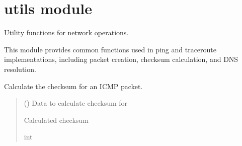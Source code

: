 \documentclass[letterpaper,10pt,english]{sphinxmanual}
\begin{document}
\sphinxstepscope


\chapter{utils module}
\label{\detokenize{utils:module-utils}}\label{\detokenize{utils:utils-module}}\label{\detokenize{utils::doc}}
\sphinxAtStartPar
Utility functions for network operations.

\sphinxAtStartPar
This module provides common functions used in ping and traceroute implementations,
including packet creation, checksum calculation, and DNS resolution.

\begin{fulllineitems}
\label{\detokenize{utils:utils.calculate_checksum}}
\pysigstartsignatures
\pysiglinewithargsret
{}
{}
{}
\pysigstopsignatures
\sphinxAtStartPar
Calculate the checksum for an ICMP packet.
\begin{quote}\begin{description}
\sphinxAtStartPar
{} () \textendash{} Data to calculate checksum for

\sphinxAtStartPar
Calculated checksum

\sphinxAtStartPar
int

\end{description}\end{quote}

\end{fulllineitems}

\end{document}
